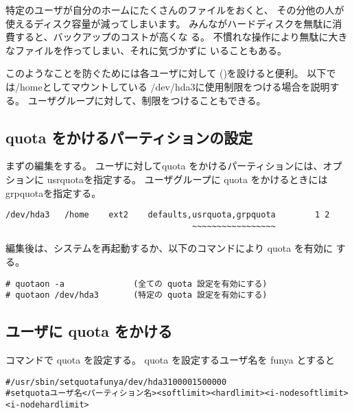 \documentclass{jreport}
\begin{document}
特定のユーザが自分のホームにたくさんのファイルをおくと、
その分他の人が使えるディスク容量が減ってしまいます。
みんながハードディスクを無駄に消費すると、バックアップのコストが高くな
る。
不慣れな操作により無駄に大きなファイルを作ってしまい、それに気づかずに
いることもある。

このようなことを防ぐためには各ユーザに対して
()を設けると便利。
以下では{\ttfamily /home}としてマウントしている
{\ttfamily /dev/hda3}に使用制限をつける場合を説明する。
ユーザグループに対して、制限をつけることもできる。

\subsection{quota をかけるパーティションの設定}
まずの編集をする。
ユーザに対してquota をかけるパーティションには、オプションに 
{\ttfamily usrquota}を指定する。
ユーザグループに quota をかけるときには{\ttfamily grpquota}を指定する。
\begin{screen}
\begin{verbatim}
/dev/hda3   /home    ext2    defaults,usrquota,grpquota        1 2
                                      ~~~~~~~~~~~~~~~~~
\end{verbatim}
\end{screen}

編集後は、システムを再起動するか、以下のコマンドにより quota を有効に
する。
\begin{screen}
\begin{verbatim}
# quotaon -a              (全ての quota 設定を有効にする)
# quotaon /dev/hda3       (特定の quota 設定を有効にする)
\end{verbatim}
\end{screen}


\subsection{ユーザに quota をかける}
 コマンドで quota を設定する。
quota を設定するユーザ名を funya とすると
\begin{screen}
\begin{alltt}
# /usr/sbin/setquota funya /dev/hda3 10000 15000 0 0
{\scriptsize# setquota ユーザ名  <パーティション名> <softlimit> <hardlimit> <i-node soft limit> <i-node hard limit>}
\end{alltt}
\end{screen}
\end{document}
